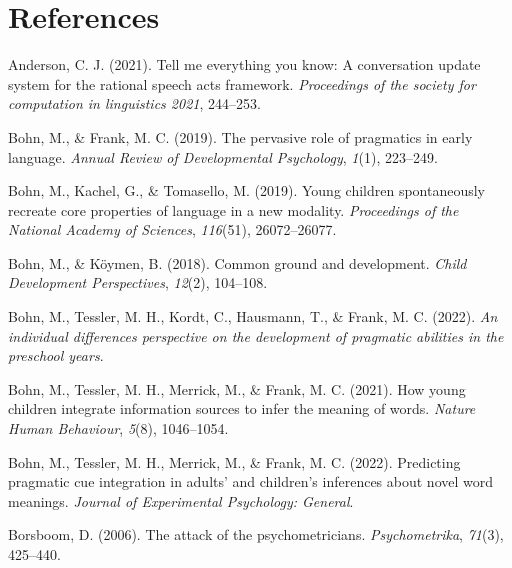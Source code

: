 \documentclass[
  man,mask,floatsintext]{apa6}
\newlength{\cslhangindent}
\newlength{\cslentryspacingunit} %
\newenvironment{CSLReferences}[2] %
 {%
  \setlength{\parindent}{0pt}
  \ifodd #1
  \let\oldpar\par
  \def\par{\hangindent=\cslhangindent\oldpar}
  \fi
  \setlength{\parskip}{#2\cslentryspacingunit}
 }%
 {}
\begin{document}
\hypertarget{references}{%
\section{References}\label{references}}

\begingroup
\setlength{\parindent}{-0.5in}
\setlength{\leftskip}{0.5in}

\hypertarget{refs}{}
\begin{CSLReferences}{1}{0}
\leavevmode{}%
Anderson, C. J. (2021). Tell me everything you know: A conversation update system for the rational speech acts framework. \emph{Proceedings of the society for computation in linguistics 2021}, 244--253.

\leavevmode{}%
Bohn, M., \& Frank, M. C. (2019). The pervasive role of pragmatics in early language. \emph{Annual Review of Developmental Psychology}, \emph{1}(1), 223--249.

\leavevmode{}%
Bohn, M., Kachel, G., \& Tomasello, M. (2019). Young children spontaneously recreate core properties of language in a new modality. \emph{Proceedings of the National Academy of Sciences}, \emph{116}(51), 26072--26077.

\leavevmode{}%
Bohn, M., \& Köymen, B. (2018). Common ground and development. \emph{Child Development Perspectives}, \emph{12}(2), 104--108.

\leavevmode{}%
Bohn, M., Tessler, M. H., Kordt, C., Hausmann, T., \& Frank, M. C. (2022). \emph{An individual differences perspective on the development of pragmatic abilities in the preschool years}.

\leavevmode{}%
Bohn, M., Tessler, M. H., Merrick, M., \& Frank, M. C. (2021). How young children integrate information sources to infer the meaning of words. \emph{Nature Human Behaviour}, \emph{5}(8), 1046--1054.

\leavevmode{}%
Bohn, M., Tessler, M. H., Merrick, M., \& Frank, M. C. (2022). Predicting pragmatic cue integration in adults' and children's inferences about novel word meanings. \emph{Journal of Experimental Psychology: General}.

\leavevmode{}%
Borsboom, D. (2006). The attack of the psychometricians. \emph{Psychometrika}, \emph{71}(3), 425--440.


\end{CSLReferences}
\end{document}
